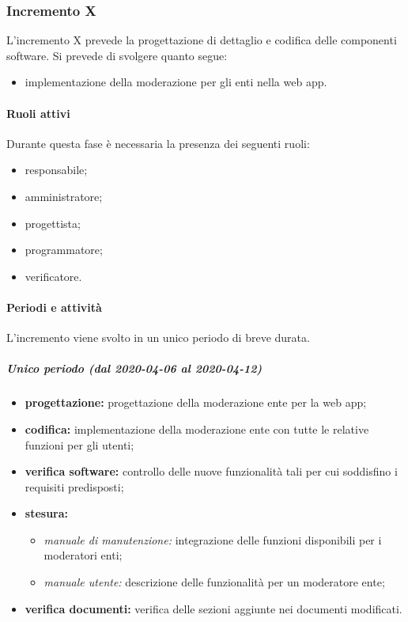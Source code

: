 
		\subsubsection{Incremento X}
			
			L'incremento X prevede la progettazione di dettaglio e codifica delle componenti software. Si prevede di svolgere quanto segue:
			\begin{itemize}
				\item implementazione della moderazione per gli enti nella web app.
			\end{itemize}
			
			\paragraph{Ruoli attivi}
			
				Durante questa fase è necessaria la presenza dei seguenti ruoli:
				\begin{itemize}
					\item responsabile;
					\item amministratore;
					\item progettista;
					\item programmatore;
					\item verificatore.
				\end{itemize}
			
			\paragraph{Periodi e attività}
			
				L'incremento viene svolto in un unico periodo di breve durata.
				
				\subparagraph{Unico periodo (dal 2020-04-06 al 2020-04-12)}
				
					\begin{itemize}
						\item \textbf{progettazione:} progettazione della moderazione ente per la web app;
						\item \textbf{codifica:} implementazione della moderazione ente con tutte le relative funzioni per gli utenti;
						\item \textbf{verifica software:} controllo delle nuove funzionalità tali per cui soddisfino i requisiti predisposti;
						\item \textbf{stesura:}
						\begin{itemize}
							\item \textit{manuale di manutenzione:} integrazione delle funzioni disponibili per i moderatori enti;
							\item \textit{manuale utente:} descrizione delle funzionalità per un moderatore ente;
						\end{itemize}
						\item \textbf{verifica documenti:} verifica delle sezioni aggiunte nei documenti modificati.
					\end{itemize} 			

